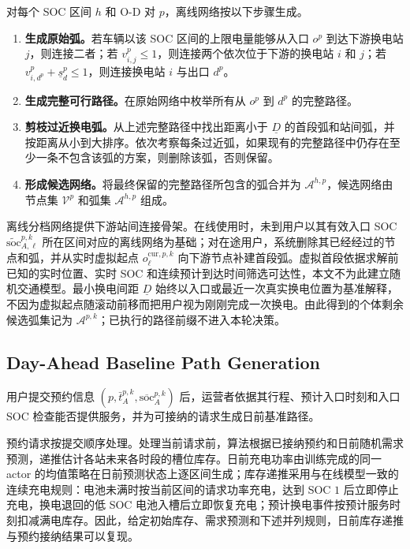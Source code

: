 \documentclass[12pt,a4paper,UTF8]{ctexart}
\begin{document}
对每个 SOC 区间 $h$ 和 O-D 对 $p$，离线网络按以下步骤生成。

\begin{enumerate}
  \item[\textbf{Step 1.}] \textbf{生成原始弧。}若车辆以该 SOC 区间的上限电量能够从入口 $o^p$ 到达下游换电站 $j$，则连接二者；若 $v_{i,j}^p\le1$，则连接两个依次位于下游的换电站 $i$ 和 $j$；若 $v_{i,d^p}^p+\underline s_d^p\le1$，则连接换电站 $i$ 与出口 $d^p$。

  \item[\textbf{Step 2.}] \textbf{生成完整可行路径。}在原始网络中枚举所有从 $o^p$ 到 $d^p$ 的完整路径。

  \item[\textbf{Step 3.}] \textbf{剪枝过近换电弧。}从上述完整路径中找出距离小于 $\underline D$ 的首段弧和站间弧，并按距离从小到大排序。依次考察每条过近弧，如果现有的完整路径中仍存在至少一条不包含该弧的方案，则删除该弧，否则保留。

  \item[\textbf{Step 4.}] \textbf{形成候选网络。}将最终保留的完整路径所包含的弧合并为 $\mathcal A^{h,p}$，候选网络由节点集 $\mathcal V^p$ 和弧集 $\mathcal A^{h,p}$ 组成。
\end{enumerate}

离线分档网络提供下游站间连接骨架。在线使用时，未到用户以其有效入口 SOC $\widetilde{\mathrm{soc}}_{A,\ell}^{p,k}$ 所在区间对应的离线网络为基础；对在途用户，系统删除其已经经过的节点和弧，并从实时虚拟起点 $o_\ell^{\mathrm{cur},p,k}$ 向下游节点补建首段弧。虚拟首段依据求解前已知的实时位置、实时 SOC 和连续预计到达时间筛选可达性，本文不为此建立随机交通模型。最小换电间距 $\underline D$ 始终以入口或最近一次真实换电位置为基准解释，不因为虚拟起点随滚动前移而把用户视为刚刚完成一次换电。由此得到的个体剩余候选弧集记为 $\mathcal A^{p,k}$；已执行的路径前缀不进入本轮决策。


\subsection{Day-Ahead Baseline Path Generation}

用户提交预约信息
$\left(p,\bar t_A^{p,k},\overline{\mathrm{soc}}_A^{p,k}\right)$
后，运营者依据其行程、预计入口时刻和入口 SOC 检查能否提供服务，并为可接纳的请求生成日前基准路径。

预约请求按提交顺序处理。处理当前请求前，算法根据已接纳预约和日前随机需求预测，递推估计各站未来各时段的槽位库存。日前充电功率由训练完成的同一 actor 的均值策略在日前预测状态上逐区间生成；库存递推采用与在线模型一致的连续充电规则：电池未满时按当前区间的请求功率充电，达到 SOC $1$ 后立即停止充电，换电退回的低 SOC 电池入槽后立即恢复充电；预计换电事件按预计服务时刻扣减满电库存。因此，给定初始库存、需求预测和下述并列规则，日前库存递推与预约接纳结果可以复现。
\end{document}
